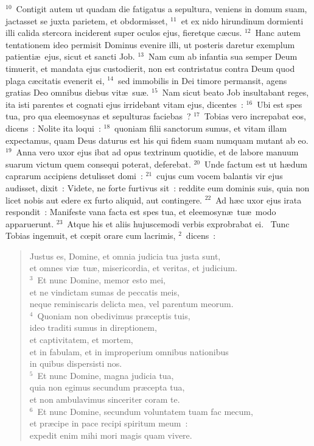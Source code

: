${}^{10}$~Contigit autem ut quadam die fatigatus a sepultura, veniens in domum suam, jactasset se juxta parietem, et obdormisset,
${}^{11}$~et ex nido hirundinum dormienti illi calida stercora inciderent super oculos ejus, fieretque c\ae cus.
${}^{12}$~Hanc autem tentationem ideo permisit Dominus evenire illi, ut posteris daretur exemplum patienti\ae\ ejus, sicut et sancti Job.
${}^{13}$~Nam cum ab infantia sua semper Deum timuerit, et mandata ejus custodierit, non est contristatus contra Deum quod plaga c\ae citatis evenerit ei,
${}^{14}$~sed immobilis in Dei timore permansit, agens gratias Deo omnibus diebus vit\ae\ su\ae .
${}^{15}$~Nam sicut beato Job insultabant reges, ita isti parentes et cognati ejus irridebant vitam ejus, dicentes~:
${}^{16}$~Ubi est spes tua, pro qua eleemosynas et sepulturas faciebas~?
${}^{17}$~Tobias vero increpabat eos, dicens~: Nolite ita loqui~:
${}^{18}$~quoniam filii sanctorum sumus, et vitam illam expectamus, quam Deus daturus est his qui fidem suam numquam mutant ab eo.
${}^{19}$~Anna vero uxor ejus ibat ad opus textrinum quotidie, et de labore manuum suarum victum quem consequi poterat, deferebat.
${}^{20}$~Unde factum est ut h\ae dum caprarum accipiens detulisset domi~:
${}^{21}$~cujus cum vocem balantis vir ejus audisset, dixit~: Videte, ne forte furtivus sit~: reddite eum dominis suis, quia non licet nobis aut edere ex furto aliquid, aut contingere.
${}^{22}$~Ad h\ae c uxor ejus irata respondit~: Manifeste vana facta est spes tua, et eleemosyn\ae\ tu\ae\ modo apparuerunt.
${}^{23}$~Atque his et aliis hujuscemodi verbis exprobrabat ei.
~\lettrine[lines=10,image=true,loversize=0.05,lraise=-0.03]{T}{}unc Tobias ingemuit, et cœpit orare cum lacrimis,
${}^{2}$~dicens~: \begin{flushleft}\begin{verse}Justus es, Domine, et omnia judicia tua justa sunt,\\ et omnes vi\ae\ tu\ae , misericordia, et veritas, et judicium.\\
${}^{3}$~Et nunc Domine, memor esto mei,\\ et ne vindictam sumas de peccatis meis,\\ neque reminiscaris delicta mea, vel parentum meorum.\\
${}^{4}$~Quoniam non obedivimus pr\ae ceptis tuis,\\ ideo traditi sumus in direptionem,\\ et captivitatem, et mortem,\\ et in fabulam, et in improperium omnibus nationibus\\ in quibus dispersisti nos.\\
${}^{5}$~Et nunc Domine, magna judicia tua,\\ quia non egimus secundum pr\ae cepta tua,\\ et non ambulavimus sinceriter coram te.\\
${}^{6}$~Et nunc Domine, secundum voluntatem tuam fac mecum,\\ et pr\ae cipe in pace recipi spiritum meum~:\\ expedit enim mihi mori magis quam vivere.\end{verse}\end{flushleft}


